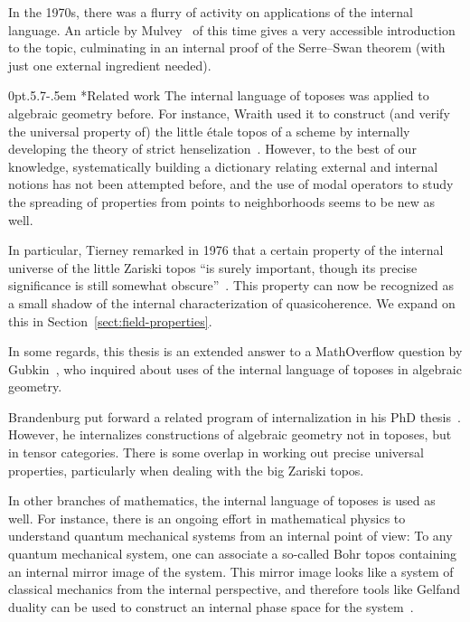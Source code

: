 \documentclass[10pt,reqno,a4paper]{amsbook}
\makeatletter
\theoremstyle{definition}
\theoremstyle{plain}
\theoremstyle{remark}
\newcommand{\?}{\,{:}\,}
\renewcommand{\_}{\mathpunct{.}\,}
\def\subsection{\@startsection{subsection}{2}%
  {0pt}{.5\linespacing\@plus.7\linespacing}{-.5em}%
  {\normalfont\bfseries}}
\makeatother
\begin{document}
{In the 1970s, there was a
flurry of activity on applications of the internal language. An article by
Mulvey~\cite{mulvey:repr} of this time gives a very accessible
introduction to the topic, culminating in an internal proof of the Serre--Swan
theorem (with just one external ingredient needed).


\subsection*{Related work} The internal language of toposes was applied to algebraic geometry before. For
instance, Wraith used it to construct (and verify the universal property
of) the little étale topos of a scheme by internally developing the theory of
strict henselization~\cite{wraith:generic-galois-theory}. However, to the best
of our knowledge, systematically building a dictionary relating external and
internal notions has not been attempted before, and the use of modal operators
to study the spreading of properties from points to neighborhoods seems to be
new as well.

In particular, Tierney remarked in 1976 that a certain property of the internal
universe of the little Zariski topos ``is surely important, though its precise
significance is still somewhat obscure''~\cite[p.~209]{tierney:spectrum}. This
property can now be recognized as a small shadow of the internal
characterization of quasicoherence. We expand on this in
Section~\ref{sect:field-properties}.

In some regards, this thesis is an extended answer to a MathOverflow question
by Gubkin~\cite{mo:gubkin}, who inquired about uses of the internal language of
toposes in algebraic geometry.

Brandenburg put forward a related program of internalization in his PhD
thesis~\cite{brandenburg:tensor-foundations}. However, he internalizes
constructions of algebraic geometry not in toposes, but in tensor categories.
There is some overlap in working out precise universal properties, particularly
when dealing with the big Zariski topos.

In other branches of mathematics, the internal language of toposes is used as well. For
instance, there is an ongoing effort in mathematical physics to understand
quantum mechanical systems from an internal point of view: To any quantum
mechanical system, one can associate a so-called Bohr topos containing an
internal mirror image of the system. This mirror image looks like a
system of classical mechanics from the internal perspective, and therefore
tools like Gelfand duality can be used to construct an internal
phase space for the system~\cite{bohr1,bohr2,bohr3}.

}
\end{document}
